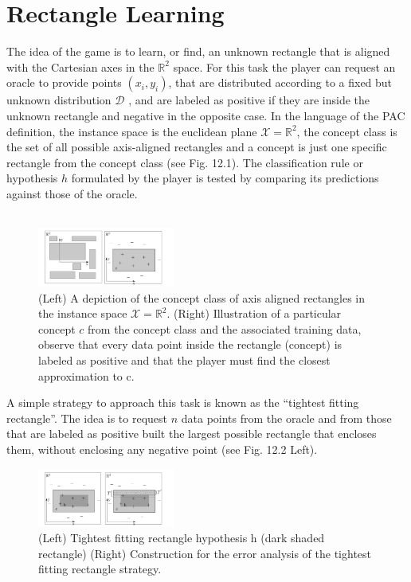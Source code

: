\documentclass[twoside]{article}
\begin{document}
 \section{Rectangle Learning}

The idea of the game is to learn, or find, an
unknown rectangle that is aligned with the Cartesian axes in the $\mathbb{R}^2$
space. For this
task the player can request an oracle to provide points $(x_{i}
, y_{i})$, that are distributed
according to a fixed but unknown distribution $\mathbf{\mathcal{D}}$ , and are labeled as positive if they are inside the unknown rectangle and negative in the opposite case. In the language
of the PAC definition, the instance space is the euclidean plane $\mathbf{\mathcal{X}}= \mathbb{R}^2$, the concept
class is the set of all possible axis-aligned rectangles and a concept is just one specific
rectangle from the concept class (see Fig. 12.1). The classification rule or hypothesis
$h$ formulated by the player is tested by comparing its predictions against those of
the oracle.\\ \\ 
\begin{figure}[h]
\centering

\includegraphics[width=0.4\textwidth]{img/pac1.png}
\caption{(Left) A depiction of the concept class of axis aligned rectangles in the instance
space $\mathcal{X} = \mathbb{R}^2$. (Right) Illustration of a particular concept $c$ from the concept class and
the associated training data, observe that every data point inside the rectangle (concept) is
labeled as positive and that the player must find the closest approximation to c.}
\end{figure}

A simple strategy to approach this task is known as the “tightest fitting rectangle”. The idea is to request $n$ data points from the oracle and from those that are labeled as positive built the largest possible rectangle that encloses them, without enclosing any negative point (see Fig. 12.2 Left).
\begin{figure}[h]
\centering
\includegraphics[width=0.4\textwidth]{img/pac2.png}
\caption{(Left) Tightest fitting rectangle hypothesis h (dark shaded rectangle) (Right)
Construction for the error analysis of the tightest fitting rectangle strategy.}
\end{figure}
\end{document}

